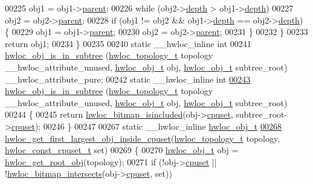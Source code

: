 \begin{DoxyCode}
00225       obj1 = obj1->\hyperlink{a00016_adc494f6aed939992be1c55cca5822900}{parent};
00226     \textcolor{keywordflow}{while} (obj2->\hyperlink{a00016_a9d82690370275d42d652eccdea5d3ee5}{depth} > obj1->\hyperlink{a00016_a9d82690370275d42d652eccdea5d3ee5}{depth})
00227       obj2 = obj2->\hyperlink{a00016_adc494f6aed939992be1c55cca5822900}{parent};
00228     \textcolor{keywordflow}{if} (obj1 != obj2 && obj1->\hyperlink{a00016_a9d82690370275d42d652eccdea5d3ee5}{depth} == obj2->\hyperlink{a00016_a9d82690370275d42d652eccdea5d3ee5}{depth}) \{
00229       obj1 = obj1->\hyperlink{a00016_adc494f6aed939992be1c55cca5822900}{parent};
00230       obj2 = obj2->\hyperlink{a00016_adc494f6aed939992be1c55cca5822900}{parent};
00231     \}
00232   \}
00233   \textcolor{keywordflow}{return} obj1;
00234 \}
00235 
00240 \textcolor{keyword}{static} \_\_hwloc\_inline \textcolor{keywordtype}{int}
00241 \hyperlink{a00053_ga08b5c1c1a95ed27a219c8af864690b3e}{hwloc_obj_is_in_subtree} (\hyperlink{a00039_ga9d1e76ee15a7dee158b786c30b6a6e38}{hwloc_topology_t} topology \_\_hwloc\_attribute\_unused, 
      \hyperlink{a00016}{hwloc_obj_t} obj, \hyperlink{a00016}{hwloc_obj_t} subtree\_root) \_\_hwloc\_attribute\_pure;
00242 \textcolor{keyword}{static} \_\_hwloc\_inline \textcolor{keywordtype}{int}
\hypertarget{a00031_source_l00243}{}\hyperlink{a00053_ga08b5c1c1a95ed27a219c8af864690b3e}{00243} \hyperlink{a00053_ga08b5c1c1a95ed27a219c8af864690b3e}{hwloc_obj_is_in_subtree} (\hyperlink{a00039_ga9d1e76ee15a7dee158b786c30b6a6e38}{hwloc_topology_t} topology \_\_hwloc\_attribute\_unused, 
      \hyperlink{a00016}{hwloc_obj_t} obj, \hyperlink{a00016}{hwloc_obj_t} subtree\_root)
00244 \{
00245   \textcolor{keywordflow}{return} \hyperlink{a00065_gaae29e14a926c198e8f91e6e4790621e7}{hwloc_bitmap_isincluded}(obj->\hyperlink{a00016_a67925e0f2c47f50408fbdb9bddd0790f}{cpuset}, subtree\_root->\hyperlink{a00016_a67925e0f2c47f50408fbdb9bddd0790f}{cpuset});
00246 \}
00247 
00267 \textcolor{keyword}{static} \_\_hwloc\_inline \hyperlink{a00016}{hwloc_obj_t}
\hypertarget{a00031_source_l00268}{}\hyperlink{a00054_gabcd5fa81a95fa5335950cae092277d5b}{00268} \hyperlink{a00054_gabcd5fa81a95fa5335950cae092277d5b}{hwloc_get_first_largest_obj_inside_cpuset}(\hyperlink{a00039_ga9d1e76ee15a7dee158b786c30b6a6e38}{hwloc_topology_t} topology, 
      \hyperlink{a00040_ga1f784433e9b606261f62d1134f6a3b25}{hwloc_const_cpuset_t} \textcolor{keyword}{set})
00269 \{
00270   \hyperlink{a00016}{hwloc_obj_t} obj = \hyperlink{a00053_gadbf58f6e187efbdb3cd9a8e30311b7d7}{hwloc_get_root_obj}(topology);
00271   \textcolor{keywordflow}{if} (!obj->\hyperlink{a00016_a67925e0f2c47f50408fbdb9bddd0790f}{cpuset} || !\hyperlink{a00065_ga575c27953709a8cb9a047aae65157526}{hwloc_bitmap_intersects}(obj->\hyperlink{a00016_a67925e0f2c47f50408fbdb9bddd0790f}{cpuset}, \textcolor{keyword}{set}))

\end{DoxyCode}

